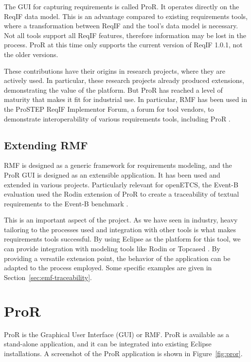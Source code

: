 \documentclass{template/openetcs_report}
\begin{document}
The GUI for capturing requirements is called ProR.  It operates directly on the ReqIF data model.  This is an advantage compared to existing requirements tools, where a transformation between ReqIF and the tool's data model is necessary.  Not all tools support all ReqIF features, therefore information may be lost in the process.  ProR at this time only supports the current version of ReqIF 1.0.1, not the older versions.

These contributions have their origins in research projects, where they are actively used. In particular, these research projects already produced extensions, demonstrating the value of the platform.  But ProR has reached a level of maturity that makes it fit for industrial use.  In particular, RMF has been used in the ProSTEP ReqIF Implementor Forum, a forum for tool vendors, to demonstrate interoperability of various requirements tools, including ProR \cite{prostep_if}.

\subsection{Extending RMF}

RMF is designed as a generic framework for requirements modeling, and the ProR GUI is designed as an extensible application.  It has been used and extended in various projects. Particularly relevant for openETCS, the Event-B evaluation used the Rodin extension of ProR to create a traceability of textual requirements to the Event-B benchmark \cite{event_b_benchmark}.

This is an important aspect of the project.  As we have seen in industry, heavy tailoring to the processes used and integration with other tools is what makes requirements tools successful.  By using Eclipse as the platform for this tool, we can provide integration with modeling tools like Rodin \cite{jastram_forms_2012} or Topcased \cite{topcase-JaGr2011}.  By providing a versatile extension point, the behavior of the application can be adapted to the process employed.  Some specific examples are given in Section~\ref{sec:emf-traceability}.

\section{ProR}
\label{pror}

ProR is the Graphical User Interface (GUI) or RMF.  ProR is available as a stand-alone application, and it can be integrated into existing Eclipse installations.  A screenshot of the ProR application is shown in Figure~\ref{fig:pror}.
\end{document}
